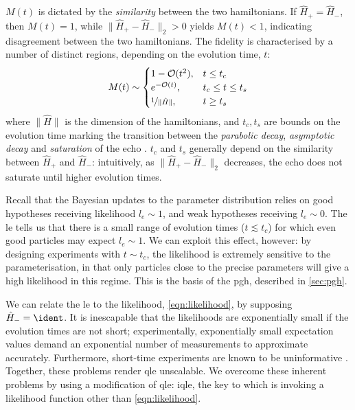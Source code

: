$M(t)$ is dictated by the \emph{similarity} between the two \glspl{hamiltonian}.
If $\hat{H}_{+} = \hat{H}_{-}$, then $M(t) = 1$, while $\|\hat{H}_{+} - \hat{H}_{-} \|_2 > 0$ yields $M(t) < 1$, 
    indicating disagreement between the two \glspl{hamiltonian}. 
The fidelity is characterised by a number of distinct regions, depending on the evolution time, $t$:
\begin{align}
    \label{eqn:loschmidt_ranges}
    M(t) \sim 
    \begin{cases}
        1 - \mathcal{O}(t^2),  & t \leq t_c \\
        e^{-\mathcal{O}(t)}, & t_c \leq t \leq t_{s} \\
        \nicefrac{1}{\| \hat{H} \|}, & t \geq t_{s}
    \end{cases}
\end{align}
    where $\|\hat{H}\|$ is the dimension of the \glspl{hamiltonian}, and $t_c, t_{s}$ are bounds on the evolution time marking the transition between the 
    \emph{parabolic decay}, \emph{asymptotic decay} and \emph{saturation} of the echo \cite{goussev2012loschmidt}. 
$t_c$ and $t_s$ generally depend on the similarity between $\hat{H}_+$ and $\hat{H}_{-}$: 
    intuitively, as $\|\hat{H}_+ - \hat{H}_{-}\|_2$ decreases, the echo does not saturate until higher evolution times. 
\par 

Recall that the Bayesian updates to the parameter distribution relies on good hypotheses receiving likelihood $l_e \sim 1$,
    and weak hypotheses receiving $l_e \sim 0$. 
The \gls{le} tells us that there is a small range of evolution times ($t \lesssim t_c$) for which even good \glspl{particle} may expect $l_e \sim 1$.
We can exploit this effect, however: 
    by designing \glspl{experiment} with $t \sim t_c$, the likelihood is extremely sensitive to the parameterisation, 
    in that only \glspl{particle} close to the precise parameters will give a high likelihood in this regime. 
This is the basis of the \acrlong{pgh}, described in \cref{sec:pgh}. 
\par 

We can relate the \gls{le} to the likelihood, \cref{eqn:likelihood}, by supposing $\hat{H}_{-} = \ident$. 
It is inescapable that the \glspl{likelihood} are exponentially small if the evolution times are not short;
    experimentally, exponentially small \glspl{expectation value} demand an exponential number of measurements to approximate accurately.
Furthermore, short-time \glspl{experiment} are known to be uninformative \cite{wiebe2014qhlpra, wiebe2015quantum}.
Together, these problems render \gls{qle} unscalable.
We overcome these inherent problems by using a modification of \gls{qle}: \gls{iqle},
    the key to which is invoking a \gls{likelihood} function other than \cref{eqn:likelihood}.
    
